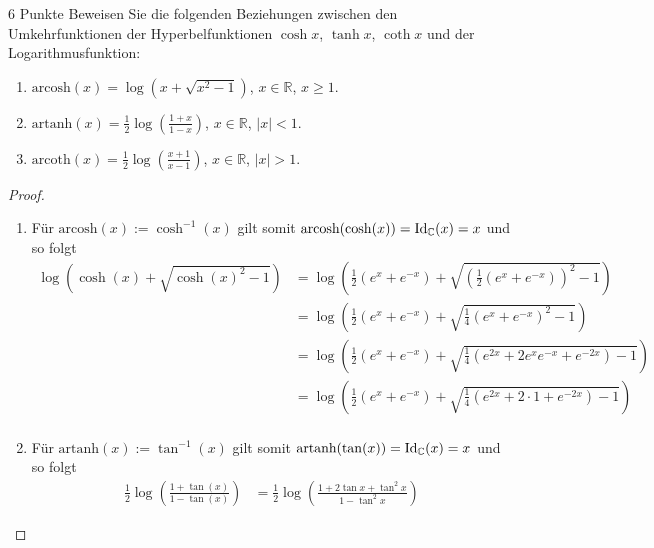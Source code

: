 \documentclass{problemset}
\begin{document}
\begin{problem}[Areafunktionen]{6 Punkte}
Beweisen Sie die folgenden Beziehungen zwischen den Umkehrfunktionen der Hyperbelfunktionen $\cosh x$, $\tanh x$, $\coth x$ und der Logarithmusfunktion:

\begin{enumerate}
    \item $\text{arcosh}(x) = \log(x + \sqrt{x^2 - 1})$, $x \in \mathbb{R}$, $x \geq 1$.

    \item $\text{artanh}(x) = \frac{1}{2} \log\left(\frac{1+x}{1-x}\right)$, $x \in \mathbb{R}$, $|x| < 1$.

    \item $\text{arcoth}(x) = \frac{1}{2} \log\left(\frac{x+1}{x-1}\right)$, $x \in \mathbb{R}$, $|x| > 1$.
\end{enumerate}

\begin{proof}
    \begin{enumerate}
        \item Für $\text{arcosh}(x) := \cosh^{-1}(x)$ gilt somit $\text{arcosh}(\cosh(x)) = \operatorname{Id}_{\mathbb{C}}(x) = x$ und so folgt
              \begin{align*}
                  \log (\cosh(x) + \sqrt{\cosh(x)^2 - 1}) & = \log\left(\frac{1}{2}(e^x + e^{-x}) + \sqrt{{\left(\frac{1}{2}(e^x + e^{-x})\right)}^2 - 1}\right) \\
                                                          & = \log\left(\frac{1}{2}(e^x + e^{-x}) + \sqrt{\frac{1}{4}{(e^x + e^{-x})}^2 - 1}\right)              \\
                                                          & = \log\left(\frac{1}{2}(e^x + e^{-x}) + \sqrt{\frac{1}{4}(e^{2x} + 2e^xe^{-x} + e^{-2x}) - 1}\right) \\
                                                          & = \log\left(\frac{1}{2}(e^x + e^{-x}) + \sqrt{\frac{1}{4}(e^{2x} + 2\cdot 1 + e^{-2x}) - 1}\right)   \\
              \end{align*}

        \item Für $\text{artanh}(x) := \tan^{-1}(x)$ gilt somit $\text{artanh}(\tan(x)) = \operatorname{Id}_{\mathbb{C}}(x) = x$ und so folgt
              \begin{align*}
                  \frac{1}{2} \log \left(\frac{1 + \tan(x)}{1 - \tan(x)}\right) & = \frac{1}{2} \log \left(\frac{1 + 2\tan x + \tan^2 x }{1 - \tan^2 x }\right)
              \end{align*}
    \end{enumerate}
\end{proof}

\end{problem}
\end{document}
